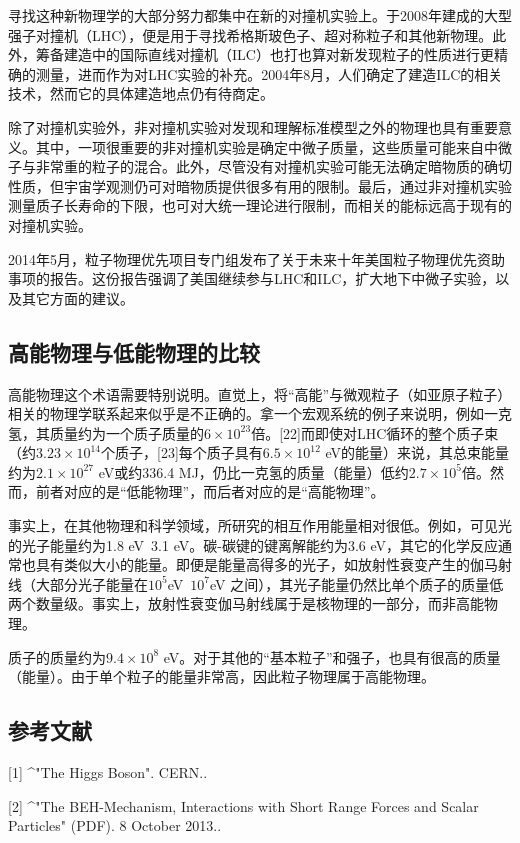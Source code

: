 寻找这种新物理学的大部分努力都集中在新的对撞机实验上。于2008年建成的大型强子对撞机（LHC），便是用于寻找希格斯玻色子、超对称粒子和其他新物理。此外，筹备建造中的国际直线对撞机（ILC）也打也算对新发现粒子的性质进行更精确的测量，进而作为对LHC实验的补充。2004年8月，人们确定了建造ILC的相关技术，然而它的具体建造地点仍有待商定。

除了对撞机实验外，非对撞机实验对发现和理解标准模型之外的物理也具有重要意义。其中，一项很重要的非对撞机实验是确定中微子质量，这些质量可能来自中微子与非常重的粒子的混合。此外，尽管没有对撞机实验可能无法确定暗物质的确切性质，但宇宙学观测仍可对暗物质提供很多有用的限制。最后，通过非对撞机实验测量质子长寿命的下限，也可对大统一理论进行限制，而相关的能标远高于现有的对撞机实验。

2014年5月，粒子物理优先项目专门组发布了关于未来十年美国粒子物理优先资助事项的报告。这份报告强调了美国继续参与LHC和ILC，扩大地下中微子实验，以及其它方面的建议。

\subsection{高能物理与低能物理的比较}
高能物理这个术语需要特别说明。直觉上，将“高能”与微观粒子（如亚原子粒子）相关的物理学联系起来似乎是不正确的。拿一个宏观系统的例子来说明，例如一克氢，其质量约为一个质子质量的$6\times10^{23}$倍。[22]而即使对LHC循环的整个质子束（约$3.23\times10^{14}$个质子，[23]每个质子具有$6.5\times10^{12}$ eV的能量）来说，其总束能量约为$2.1\times10^{27}$ eV或约336.4 MJ，仍比一克氢的质量（能量）低约$2.7\times10^{5}$倍。然而，前者对应的是“低能物理”，而后者对应的是“高能物理”。

事实上，在其他物理和科学领域，所研究的相互作用能量相对很低。例如，可见光的光子能量约为1.8 eV~3.1 eV。碳-碳键的键离解能约为3.6 eV，其它的化学反应通常也具有类似大小的能量。即便是能量高得多的光子，如放射性衰变产生的伽马射线（大部分光子能量在$10^{5} $eV~$10^{7}$eV 之间），其光子能量仍然比单个质子的质量低两个数量级。事实上，放射性衰变伽马射线属于是核物理的一部分，而非高能物理。

质子的质量约为$9.4\times10^{8}$ eV。对于其他的“基本粒子”和强子，也具有很高的质量（能量）。由于单个粒子的能量非常高，因此粒子物理属于高能物理。

\subsection{参考文献}
[1]
^"The Higgs Boson". CERN..

[2]
^"The BEH-Mechanism, Interactions with Short Range Forces and Scalar Particles" (PDF). 8 October 2013..


